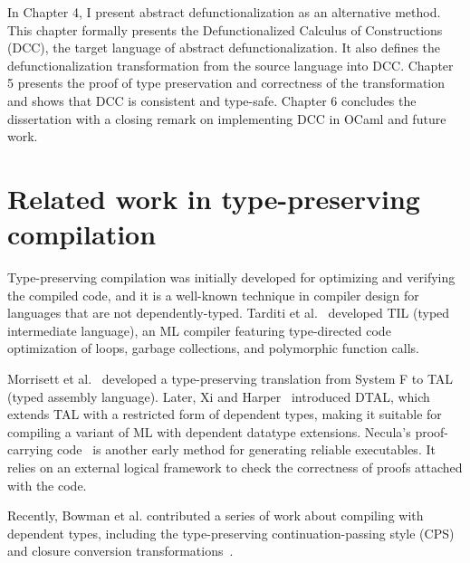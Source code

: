 In Chapter 4, I present abstract defunctionalization as an alternative method. This chapter formally presents the Defunctionalized Calculus of Constructions (DCC), the target language of abstract defunctionalization. It also defines the defunctionalization transformation from the source language into DCC. Chapter 5 presents the proof of type preservation and correctness of the transformation and shows that DCC is consistent and type-safe. Chapter 6 concludes the dissertation with a closing remark on implementing DCC in OCaml and future work.

\section{Related work in type-preserving compilation}

Type-preserving compilation was initially developed for optimizing and verifying the compiled code, and it is a well-known technique in compiler design for languages that are not dependently-typed. Tarditi et al.~\cite{DBLP:conf/pldi/TarditiMCSHL96} developed TIL (typed intermediate language), an ML compiler featuring type-directed code optimization of loops, garbage collections, and polymorphic function calls. 

Morrisett et al.~\cite{DBLP:journals/toplas/MorrisettWCG99} developed a type-preserving translation from System F to TAL (typed assembly language). Later, Xi and Harper~\cite{DBLP:conf/icfp/XiH01} introduced DTAL, which extends TAL with a restricted form of dependent types, making it suitable for compiling a variant of ML with dependent datatype extensions. Necula’s proof-carrying code~\cite{DBLP:conf/popl/Necula97} is another early method for generating reliable executables. It relies on an external logical framework to check the correctness of proofs attached with the code.

Recently, Bowman et al. contributed a series of work about compiling with dependent types, including the type-preserving continuation-passing style (CPS) and closure conversion transformations~\cite{DBLP:journals/pacmpl/BowmanCRA18,DBLP:conf/pldi/BowmanA18}.



